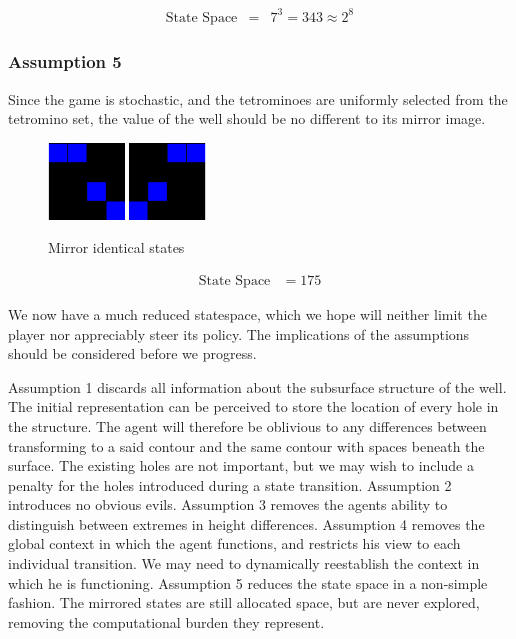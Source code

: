 \documentclass[a4paper,twocolumn]{article}
\begin{document}
\begin{eqnarray}
\textrm{State Space} & = & 7^{3} = 343 \approx 2^{8}
\end{eqnarray}

\subsubsection*{Assumption 5}

Since the game is stochastic, and the tetrominoes are uniformly selected from the tetromino set, the value of the well should be no different to its mirror image.

\begin{figure}[h]
\centering
\includegraphics[width=0.8in]{reducedwell.png}
\includegraphics[width=0.8in]{mirrorwell.png}
\caption{Mirror identical states}
\label{fig:mirrorwell}
\end{figure}

\begin{eqnarray}
\textrm{State Space} & = 175
\end{eqnarray}

We now have a much reduced statespace, which we hope will neither limit the player nor appreciably steer its policy. The implications of the assumptions should be considered before we progress.

Assumption 1 discards all information about the subsurface structure of the well. The initial representation can be perceived to store the location of every hole in the structure. The agent will therefore be oblivious to any differences between transforming to a said contour and the same contour with spaces beneath the surface. The existing holes are not important, but we may wish to include a penalty for the holes introduced during a state transition.
Assumption 2 introduces no obvious evils.
Assumption 3 removes the agents ability to distinguish between extremes in height differences.
Assumption 4 removes the global context in which the agent functions, and restricts his view to each individual transition. We may need to dynamically reestablish the context in which he is functioning.
Assumption 5 reduces the state space in a non-simple fashion. The mirrored states are still allocated space, but are never explored, removing the computational burden they represent. 
\end{document}
